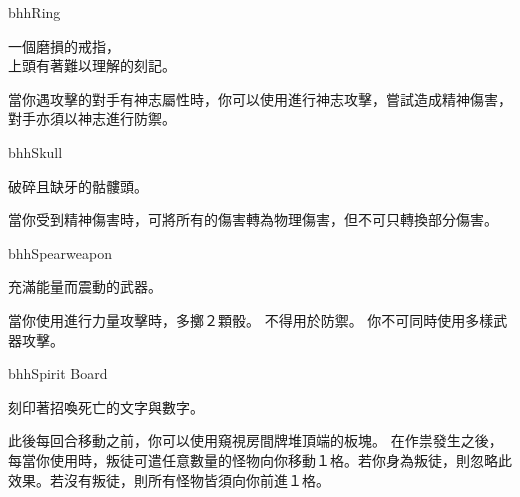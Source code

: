 \linebreak[0]%
\begin{OmenCard}{bhh}{Ring}{}
  \begin{CardStory}
    一個磨損的戒指，\\
    上頭有著難以理解的刻記。
  \end{CardStory}
  當你遇攻擊的對手有神志屬性時，你可以使用\ThisName{}進行神志攻擊，嘗試造成精神傷害，對手亦須以神志進行防禦。\smallbreak
\end{OmenCard}%
\linebreak[0]%
\begin{OmenCard}{bhh}{Skull}{}
  \begin{CardStory}
    破碎且缺牙的骷髏頭。
  \end{CardStory}
  當你受到精神傷害時，可將所有的傷害轉為物理傷害，但不可只轉換部分傷害。\smallbreak
\end{OmenCard}%
\linebreak[0]%
\begin{OmenCard}{bhh}{Spear}{weapon}
  \begin{CardStory}
    充滿能量而震動的武器。
  \end{CardStory}
  當你使用\ThisName{}進行力量攻擊時，多擲２顆骰。\smallbreak
  \ThisName{}不得用於防禦。\smallbreak
  你不可同時使用多樣武器攻擊。\smallbreak
\end{OmenCard}%
\linebreak[0]%
\begin{OmenCard}{bhh}{Spirit Board}{}
  \begin{CardStory}
    刻印著招喚死亡的文字與數字。
  \end{CardStory}
  此後每回合移動之前，你可以使用\ThisName{}窺視房間牌堆頂端的板塊。\smallbreak
  在作祟發生之後，每當你使用\ThisName{}時，叛徒可遣任意數量的怪物向你移動１格。若你身為叛徒，則忽略此效果。若沒有叛徒，則所有怪物皆須向你前進１格。\smallbreak
\end{OmenCard}%
\linebreak[0]%
